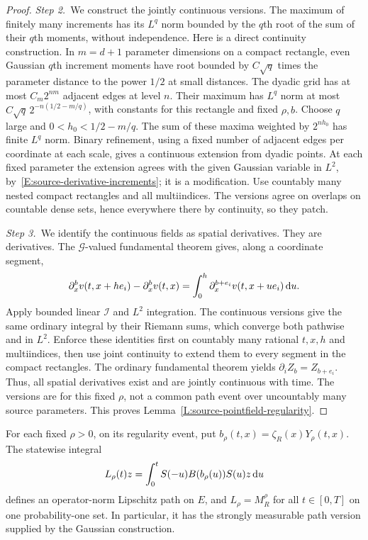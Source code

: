 \begin{proof}
  \medskip
  \noindent\textit{Step 2.~}We construct the jointly continuous versions.
  The maximum of finitely many increments has its $L^q$ norm bounded by the
  $q$th root of the sum of their $q$th moments, without independence.
  Here is a direct continuity construction. In $m = d+1$ parameter dimensions on
  a compact rectangle, even Gaussian $q$th increment moments have root bounded
  by $C\sqrt q$ times the parameter distance to the power $1/2$ at small
  distances. The dyadic grid has at most $C_m2^{nm}$ adjacent edges at level
  $n$. Their maximum has $L^q$ norm at most $C\sqrt q\,2^{-n(1/2-m/q)}$, with
  constants for this rectangle and fixed $\rho,b$. Choose $q$ large and $0 < h_0
  < 1/2-m/q$. The sum of these maxima weighted by $2^{nh_0}$ has finite $L^q$
  norm. Binary refinement, using a fixed number of adjacent edges per coordinate
  at each scale, gives a continuous extension from dyadic points. At each fixed
  parameter the extension agrees with the given Gaussian variable in $L^2$,
  by~\eqref{E:source-derivative-increments}; it is a modification. Use countably
  many nested compact rectangles and all multiindices. The versions agree on
  overlaps on countable dense sets, hence everywhere there by continuity, so
  they patch.


  \medskip
  \noindent\textit{Step 3.~}We identify the continuous fields as spatial
  derivatives.
  They are derivatives. The $\mathcal{G}$-valued fundamental theorem gives,
  along a coordinate segment,
  \[
    \partial_x^bv(t,x+he_i)-\partial_x^bv(t,x)
    =\int_0^h\partial_x^{b+e_i}v(t,x+ue_i)\,\mathrm{d} u.
  \]
  Apply bounded linear $\mathcal{I}$ and $L^2$ integration. The continuous
  versions give the same ordinary integral by their Riemann sums, which converge
  both pathwise and in $L^2$. Enforce these identities first on countably many
  rational $t,x,h$ and multiindices, then use joint continuity to extend them to
  every segment in the compact rectangles. The ordinary fundamental theorem
  yields $\partial_iZ_b = Z_{b+e_i}$. Thus, all spatial derivatives exist and
  are jointly continuous with time. The versions are for this fixed $\rho$, not
  a common path event over uncountably many source parameters. This proves
  Lemma~\ref{L:source-pointfield-regularity}.
\end{proof}

\begin{proposition}\label{P:source-ordinary-response}
  For each fixed $\rho > 0$, on its regularity event, put $b_\rho(t,x) =
  \zeta_R(x)Y_\rho(t,x)$. The statewise integral
  \begin{equation}\label{E:source-ordinary-response}
    L_\rho(t)z=\int_0^tS(-u)B(b_\rho(u))S(u)z\,\mathrm{d} u
  \end{equation}
  defines an operator-norm Lipschitz path on $E$, and $L_\rho = M_R^\rho$ for
  all $t \in [0,T]$ on one probability-one set. In particular, it has the
  strongly measurable path version supplied by the Gaussian construction.
\end{proposition}

